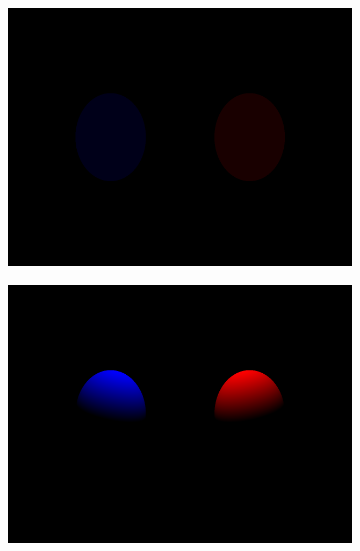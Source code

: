 \documentclass{article}
\begin{document}
\begin{figure}[hb]
  \begin{subfigure}{0.45\textwidth}
    \includegraphics[width=1\textwidth]{images/phong1.png}
  \end{subfigure}
  \begin{subfigure}{0.45\textwidth}
    \includegraphics[width=1\textwidth]{images/phong2.png}
  \end{subfigure}


\end{figure}
\end{document}
